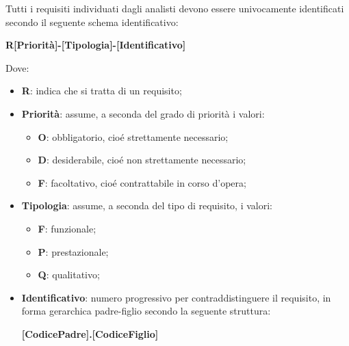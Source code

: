 Tutti i requisiti individuati dagli analisti devono essere univocamente identificati secondo il seguente schema identificativo:

\begin{center}
    \textbf{R[Priorit\`{a}]-[Tipologia]-[Identificativo]}
\end{center}

Dove:

\begin{itemize}
    \item \textbf{R}: indica che si tratta di un requisito;
    \item \textbf{Priorit\`{a}}: assume, a seconda del grado di priorit\`{a} i valori:
    \begin{itemize}
        \item \textbf{O}: obbligatorio, cio\'{e} strettamente necessario;
        \item \textbf{D}: desiderabile, cio\'{e} non strettamente necessario;
        \item \textbf{F}: facoltativo, cio\'{e} contrattabile in corso d'opera;
    \end{itemize}
    \item \textbf{Tipologia}: assume, a seconda del tipo di requisito, i valori:
    \begin{itemize}
        \item \textbf{F}: funzionale;
        \item \textbf{P}: prestazionale;
        \item \textbf{Q}: qualitativo;
    \end{itemize}
    \item \textbf{Identificativo}: numero progressivo per contraddistinguere il requisito, in forma gerarchica padre-figlio secondo la seguente struttura:
    \begin{center}
        \textbf{[CodicePadre].[CodiceFiglio]}
    \end{center}
\end{itemize}